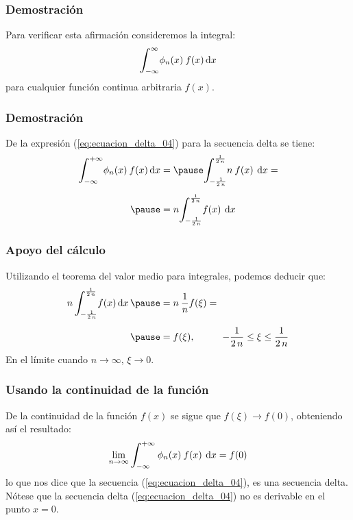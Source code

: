 \documentclass[12pt]{beamer}
\begin{document}
\begin{frame}
\frametitle{Demostración}
Para verificar esta afirmación consideremos la integral:
\pause
\begin{align*}
\scaleint{6ex}_{\bs -\infty}^{\infty} \phi_{n} (x) \: f (x) \dd{x}
\end{align*}
para cualquier función continua arbitraria $f (x)$.
\end{frame}

\begin{frame}
\frametitle{Demostración}
De la expresión (\ref{eq:ecuacion_delta_04}) para la secuencia delta se tiene:
\pause
\begin{eqnarray*}
\scaleint{6ex}_{\bs -\infty}^{+ \infty} \phi_{n} (x) \: f (x) \dd{x} &=  \pause \scaleint{6ex}_{\bs -\frac{1}{2 \, n}}^{\frac{1}{2 \, n}} n \: f (x) \: \dd{x} = \\[0.5em] \pause
&= n \scaleint{6ex}_{\bs -\frac{1}{2 \, n}}^{\frac{1}{2 \, n}} f (x) \:  \dd{x}
\end{eqnarray*}
\end{frame}

\begin{frame}
\frametitle{Apoyo del cálculo}
Utilizando el teorema del valor medio para integrales, podemos deducir que:
\pause
\begin{eqnarray*}
\begin{aligned}
n \, \scaleint{6ex}_{\bs -\frac{1}{2 \, n}}^{\frac{1}{2 \, n}} f (x) \dd{x} \pause &= n \: \dfrac{1}{n} f (\xi) = \\[0.5em] \pause
&= f (\xi), \hspace{1cm} - \dfrac{1}{2 \, n} \leq \xi \leq \dfrac{1}{2 \, n}
\end{aligned}
\end{eqnarray*}
En el límite cuando $n \to \infty$, $\xi \to 0$.
\end{frame}

\begin{frame}
\frametitle{Usando la continuidad de la función}
De la continuidad de la función $f (x)$ se sigue que $f (\xi) \to f (0)$, obteniendo así el resultado:
\pause
\begin{align*}
\lim_{n \to \infty} \scaleint{6ex}_{\bs -\infty}^{+ \infty} \: \phi_{n} (x) \: f (x) \: \dd{x} = f (0)
\end{align*}
lo que nos dice que la secuencia (\ref{eq:ecuacion_delta_04}), es una secuencia delta. \pause  Nótese que la secuencia delta (\ref{eq:ecuacion_delta_04}) no es derivable en el punto $x = 0$.
\end{frame}
\end{document}
